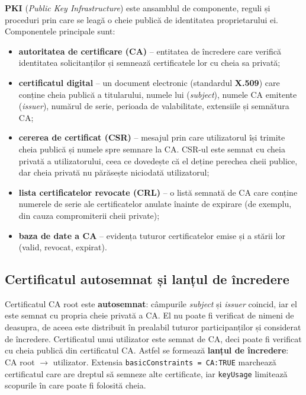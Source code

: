 \documentclass[12pt,a4paper]{article}
\begin{document}
\textbf{PKI} (\textit{Public Key Infrastructure}) este ansamblul de componente,
reguli și proceduri prin care se leagă o cheie publică de identitatea
proprietarului ei. Componentele principale sunt:
\begin{itemize}
    \item \textbf{autoritatea de certificare (CA)} -- entitatea de încredere care
    verifică identitatea solicitanților și semnează certificatele lor cu cheia
    sa privată;
    \item \textbf{certificatul digital} -- un document electronic (standardul
    \textbf{X.509}) care conține cheia publică a titularului, numele lui
    (\textit{subject}), numele CA emitente (\textit{issuer}), numărul de serie,
    perioada de valabilitate, extensiile și semnătura CA;
    \item \textbf{cererea de certificat (CSR)} -- mesajul prin care utilizatorul
    își trimite cheia publică și numele spre semnare la CA. CSR-ul este semnat
    cu cheia privată a utilizatorului, ceea ce dovedește că el deține perechea
    cheii publice, dar cheia privată nu părăsește niciodată utilizatorul;
    \item \textbf{lista certificatelor revocate (CRL)} -- o listă semnată de CA
    care conține numerele de serie ale certificatelor anulate înainte de
    expirare (de exemplu, din cauza compromiterii cheii private);
    \item \textbf{baza de date a CA} -- evidența tuturor certificatelor emise și
    a stării lor (valid, revocat, expirat).
\end{itemize}

\subsection{Certificatul autosemnat și lanțul de încredere}

Certificatul CA root este \textbf{autosemnat}: câmpurile \textit{subject} și
\textit{issuer} coincid, iar el este semnat cu propria cheie privată a CA. El
nu poate fi verificat de nimeni de deasupra, de aceea este distribuit în
prealabil tuturor participanților și considerat de încredere. Certificatul unui
utilizator este semnat de CA, deci poate fi verificat cu cheia publică din
certificatul CA. Astfel se formează \textbf{lanțul de încredere}: CA root
$\rightarrow$ utilizator. Extensia \texttt{basicConstraints = CA:TRUE} marchează
certificatul care are dreptul să semneze alte certificate, iar
\texttt{keyUsage} limitează scopurile în care poate fi folosită cheia.
\end{document}

